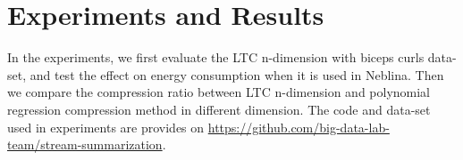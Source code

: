 \chapter{Experiments and Results}
\label{chap:expsAndResults}
In the experiments, we first evaluate the LTC n-dimension with biceps curls
data-set, and test the effect on energy consumption when it is used in Neblina.
Then we compare the compression ratio between LTC n-dimension and polynomial
regression compression method in different dimension. The code and data-set used
in experiments are provides on
\url{https://github.com/big-data-lab-team/stream-summarization}. 






